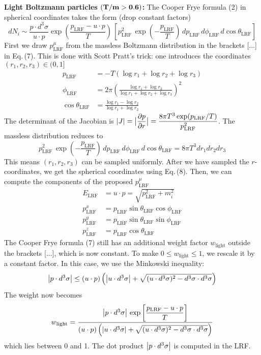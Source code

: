 \documentclass[10.5pt,aps,prd,superscriptaddress]{revtex4}
\newcommand{\be}{\begin{equation}}
\newcommand{\ee}{\end{equation}}
\newcommand{\bs}{\begin{subequations}}
\newcommand{\es}{\end{subequations}}
\newcommand{\beal}{\begin{align}}
\newcommand{\LRF}{\text{LRF}}
\newcommand{\nn}{\newline\newline}
\begin{document}
\nn
{\bf{Light Boltzmann particles $\bf{(T / m > 0.6)}$:}}
\nn
The Cooper Frye formula (2) in spherical coordinates takes the form (drop constant factors) 
\be
 dN_i \sim \frac{p \cdot d^3\sigma}{u\cdot p} \exp\left(\frac{p_{\text{LRF}} - u \cdot p }{T}\right) \, \left[p_{\text{LRF}}^2 \, \exp\left(-\frac{p_{\text{LRF}}}{T}\right) \, dp _{\text{LRF}}\, d\phi_{\text{LRF}} \, d\cos\theta_{\text{LRF}}\right]
\ee
First we draw $p^\mu_\LRF$ from the massless Boltzmann distribution in the brackets [...] in Eq.\,(7). This is done with Scott Pratt's trick: one introduces the coordinates $(r_1, r_2, r_3) \in (0,1]$ 
\bs
\beal
p_\LRF &= - T (\log r_1 + \log r_2 + \log r_3) \\
\phi_\LRF & = 2\pi \left(\frac{\log r_1 + \log r_2}{\log r_1 + \log r_2 + \log r_3}\right)^2 \\
\cos\theta_\LRF & = \frac{\log r_1 - \log r_2}{\log r_1 + \log r_2}
\end{align}
\es
The determinant of the Jacobian is $\abs{J} = \big|\dfrac{\partial p}{\partial r}\big| = \dfrac{8 \pi T^3 \exp(p_\LRF / T)}{p_\LRF^2}$. The massless distribution reduces to
\be
p_{\text{LRF}}^2 \, \exp\left(-\frac{p_{\text{LRF}}}{T}\right) \, dp _{\text{LRF}}\, d\phi_{\text{LRF}} \, d\cos\theta_{\text{LRF}} = 8\pi T^3 dr_1 dr_2 dr_3
\ee
This means $(r_1,r_2,r_3)$ can be sampled uniformly. After we have sampled the $r$-coordinates, we get the spherical coordinates using Eq.\,(8). Then, we can compute the components of the proposed $p^\mu_\LRF$
\bs
\beal
E_\LRF &= u \cdot p =  \sqrt{p_\LRF^2 + m_i^2} \\
p^x_\LRF &= p_\LRF \sin\theta_\LRF \cos\phi_\LRF \\ 
p^y_\LRF &= p_\LRF \sin\theta_\LRF \sin\phi_\LRF \\ 
p^z_\LRF &= p_\LRF \cos\theta_\LRF  
\end{align}
\es
The Cooper Frye formula (7) still has an additional weight factor $w_{\text{light}}$ outside the brackets [...], which is now constant. To make $0 \leq w_{\text{light}} \leq 1$, we rescale it by a constant factor. In this case, we use the Minkowski inequality:
\be
\abs{p \cdot d^3\sigma} \leq (u\cdot p)\left(\abs{u \cdot d^3\sigma} + \sqrt{(u \cdot d^3\sigma)^2 - d^3\sigma \cdot d^3\sigma}\right)
\ee
The weight now becomes
\be
w_{\text{light}} = \frac{\abs{p \cdot d^3\sigma} \,\exp\left[\dfrac{p_{\text{LRF}} - u \cdot p }{T}\right]}{(u\cdot p) \left(\abs{u \cdot d^3\sigma} + \sqrt{(u \cdot d^3\sigma)^2 - d^3\sigma \cdot d^3\sigma}\right)
}
\ee
which lies between 0 and 1. The dot product $\left\lvert p \cdot d^3\sigma\right\rvert$ is computed in the LRF. 
\end{document}
